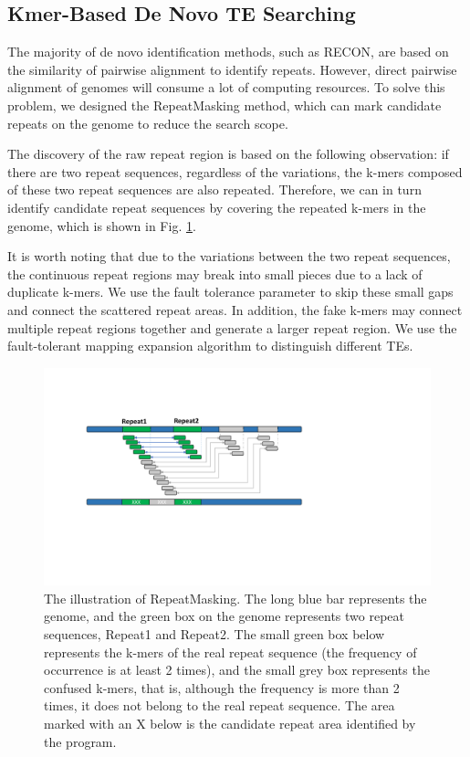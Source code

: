 \documentclass{bmcart}
\begin{document}
\subsection*{Kmer-Based De Novo TE Searching}
The majority of de novo identification methods, such as RECON, are based on the similarity of pairwise alignment to identify repeats. However, direct pairwise alignment of genomes will consume a lot of computing resources. To solve this problem, we designed the RepeatMasking method, which can mark candidate repeats on the genome to reduce the search scope.

The discovery of the raw repeat region is based on the following observation: if there are two repeat sequences, regardless of the variations, the k-mers composed of these two repeat sequences are also repeated. Therefore, we can in turn identify candidate repeat sequences by covering the repeated k-mers in the genome, which is shown in Fig. \ref{fig:repeatmasking}.

It is worth noting that due to the variations between the two repeat sequences, the continuous repeat regions may break into small pieces due to a lack of duplicate k-mers. We use the fault tolerance parameter to skip these small gaps and connect the scattered repeat areas. In addition, the fake k-mers may connect multiple repeat regions together and generate a larger repeat region. We use the fault-tolerant mapping expansion algorithm to distinguish different TEs.

\begin{figure}[h!]
	\centerline{\includegraphics[width=1.0\textwidth]{figures/RepeatMasking.pdf}}
	\caption{The illustration of RepeatMasking. The long blue bar represents the genome, and the green box on the genome represents two repeat sequences, Repeat1 and Repeat2. The small green box below represents the k-mers of the real repeat sequence (the frequency of occurrence is at least 2 times), and the small grey box represents the confused k-mers, that is, although the frequency is more than 2 times, it does not belong to the real repeat sequence. The area marked with an X below is the candidate repeat area identified by the program.}
	\label{fig:repeatmasking}
\end{figure}
\end{document}

